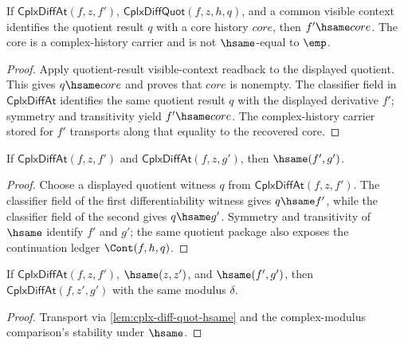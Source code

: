 \begin{theorem}
\label{thm:cplx-diff-at-quotient-result-visible-context-derivative-readback}
If \(\mathsf{CplxDiffAt}(f,z,f')\), \(\mathsf{CplxDiffQuot}(f,z,h,q)\), and
a common visible context identifies the quotient result \(q\) with a core
history \(core\), then \(f'\hsame core\). The core is a complex-history carrier
and is not \(\hsame\)-equal to \(\emp\).
\end{theorem}
\begin{proof}
Apply quotient-result visible-context readback to the displayed quotient. This
gives \(q\hsame core\) and proves that \(core\) is nonempty. The classifier
field in \(\mathsf{CplxDiffAt}\) identifies the same quotient result \(q\) with
the displayed derivative \(f'\); symmetry and transitivity yield
\(f'\hsame core\). The complex-history carrier stored for \(f'\) transports
along that equality to the recovered core.
\end{proof}

\begin{lemma}
\label{lem:cplx-diff-at-unique}
If \(\mathsf{CplxDiffAt}(f, z, f')\) and \(\mathsf{CplxDiffAt}(f, z, g')\), then \(\hsame(f', g')\).
\end{lemma}
\begin{proof}
Choose a displayed quotient witness \(q\) from \(\mathsf{CplxDiffAt}(f,z,f')\). The classifier field of the first differentiability witness gives \(q\hsame f'\), while the classifier field of the second gives \(q\hsame g'\). Symmetry and transitivity of \(\hsame\) identify \(f'\) and \(g'\); the same quotient package also exposes the continuation ledger \(\Cont(f,h,q)\).
\end{proof}

\begin{lemma}
\label{lem:cplx-diff-at-hsame}
If \(\mathsf{CplxDiffAt}(f, z, f')\), \(\hsame(z, z')\), and \(\hsame(f', g')\), then \(\mathsf{CplxDiffAt}(f, z', g')\) with the same modulus \(\delta\).
\end{lemma}
\begin{proof}
Transport via \autoref{lem:cplx-diff-quot-hsame} and the complex-modulus comparison's stability under \(\hsame\).
\end{proof}

